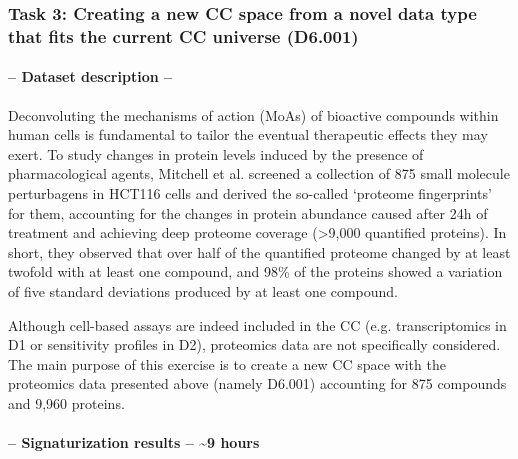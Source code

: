 

\subsubsection{Task 3: Creating a new CC space from a novel data type that fits the current CC universe (D6.001)}

\paragraph{-- Dataset description --} \leavevmode

Deconvoluting the mechanisms of action (MoAs) of bioactive compounds within human cells is fundamental to tailor the eventual therapeutic effects they may exert. To study changes in protein levels induced by the presence of pharmacological agents, Mitchell et al.\cite{mitchell_proteome-wide_2023} screened a collection of 875 small molecule perturbagens in HCT116 cells and derived the so-called ‘proteome fingerprints’ for them, accounting for the changes in protein abundance caused after 24h of treatment and achieving deep proteome coverage (>9,000 quantified proteins). In short, they observed that over half of the quantified proteome changed by at least twofold with at least one compound, and 98\% of the proteins showed a variation of five standard deviations produced by at least one compound. 

Although cell-based assays are indeed included in the CC (e.g. transcriptomics in D1 or sensitivity profiles in D2), proteomics data are not specifically considered. The main purpose of this exercise is to create a new CC space with the proteomics data presented above (namely D6.001) accounting for 875 compounds and 9,960 proteins.  

\paragraph{-- Signaturization results -- \textasciitilde9 hours}  \leavevmode

